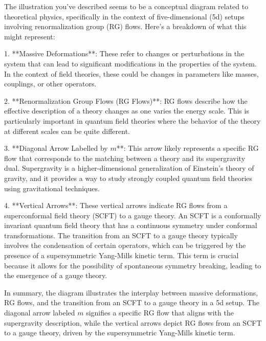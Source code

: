 The illustration you've described seems to be a conceptual diagram related to theoretical physics, specifically in the context of five-dimensional (5d) setups involving renormalization group (RG) flows. Here's a breakdown of what this might represent:

1. **Massive Deformations**: These refer to changes or perturbations in the system that can lead to significant modifications in the properties of the system. In the context of field theories, these could be changes in parameters like masses, couplings, or other operators.

2. **Renormalization Group Flows (RG Flows)**: RG flows describe how the effective description of a theory changes as one varies the energy scale. This is particularly important in quantum field theories where the behavior of the theory at different scales can be quite different.

3. **Diagonal Arrow Labelled by \(m\)**: This arrow likely represents a specific RG flow that corresponds to the matching between a theory and its supergravity dual. Supergravity is a higher-dimensional generalization of Einstein's theory of gravity, and it provides a way to study strongly coupled quantum field theories using gravitational techniques.

4. **Vertical Arrows**: These vertical arrows indicate RG flows from a superconformal field theory (SCFT) to a gauge theory. An SCFT is a conformally invariant quantum field theory that has a continuous symmetry under conformal transformations. The transition from an SCFT to a gauge theory typically involves the condensation of certain operators, which can be triggered by the presence of a supersymmetric Yang-Mills kinetic term. This term is crucial because it allows for the possibility of spontaneous symmetry breaking, leading to the emergence of a gauge theory.

In summary, the diagram illustrates the interplay between massive deformations, RG flows, and the transition from an SCFT to a gauge theory in a 5d setup. The diagonal arrow labeled \(m\) signifies a specific RG flow that aligns with the supergravity description, while the vertical arrows depict RG flows from an SCFT to a gauge theory, driven by the supersymmetric Yang-Mills kinetic term.